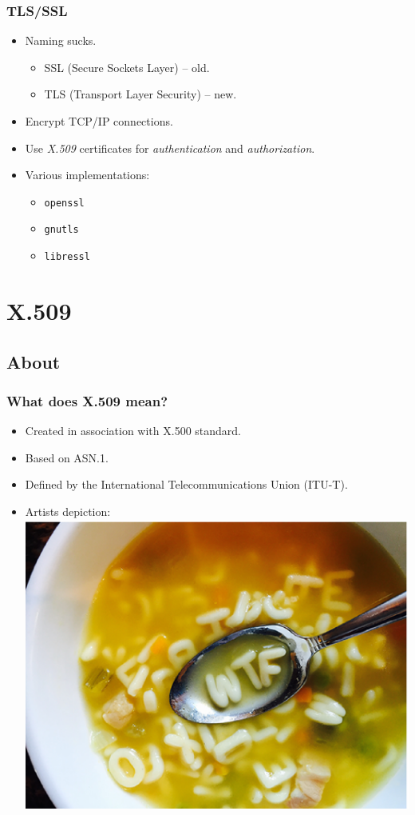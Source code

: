 \documentclass[xcolor={dvipsnames,svgnames},hyperref=dvips]{beamer}
\begin{document}
	\begin{frame}
		\frametitle{TLS/SSL}
		\begin{itemize}
		\item Naming sucks.
			\begin{itemize}
			\item SSL (Secure Sockets Layer) -- old.
			\item TLS (Transport Layer Security) -- new.
			\end{itemize}
		\item Encrypt TCP/IP connections.
		\item Use \textit{X.509} certificates for \textit{authentication} and \textit{authorization}.
		\item Various implementations:
			\begin{itemize}
			\item \texttt{openssl}
			\item \texttt{gnutls}
			\item \texttt{libressl}
			\end{itemize}
		\end{itemize}
	\end{frame}

\section{X.509}
\subsection{About}
	\begin{frame}
		\frametitle{What does X.509 mean?}
		\begin{itemize}
		\item Created in association with X.500 standard.
		\item Based on ASN.1.
		\item Defined by the International Telecommunications Union (ITU-T).
		\item Artists depiction: \\
			\center\includegraphics[scale=0.27]{wtfsoup.ps}
		\end{itemize}
	\end{frame}
\end{document}
